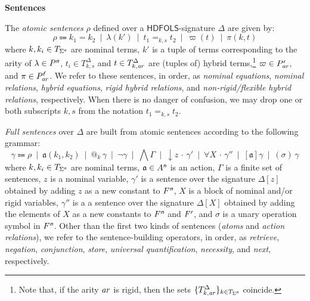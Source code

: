 \documentclass[a4paper,UKenglish,cleveref, autoref]{lipics-v2019}
\makeatletter
\newcommand{\HDFOLS}{{\mathsf{HDFOLS}}}
\newcommand{\alt}{\enspace|\enspace}
\newcommand{\keyscript}[1]{\text{\normalfont\sffamily\itshape #1}}
\newcommand{\ari}{\mathit{a\mkern -1mu r}}
\newcommand{\act}{\mathfrak{a}}
\newcommand{\nominal}{\keyscript{n}}
\newcommand{\rigid}{\keyscript{r}}
\newcommand{\flexible}{\keyscript{f}}
\newcommand{\bigand}{\bigwedge}
\newcommand{\at}[1]{@_{#1}\,}
\newcommand{\nec}[1]{[#1]}
\newcommand{\store}[1]{{\downarrow}#1\,{\cdot}\,}
\newcommand{\forAll}[1]{\forall #1\,{\cdot}\,}
\newcommand{\lnext}[1]{(#1)\,}
\newcommand{\minisec}[1]{%
  \par\addvspace{\smallskipamount}\noindent%
  \textbf{\sffamily #1}\enspace%
}
\makeatother
\begin{document}


\minisec{Sentences}
The \emph{atomic sentences} \(\rho\) defined over a \(\HDFOLS\)-signature \(\Delta\) are given by:
\[
  \rho \Coloneqq
  k_{1} = k_{2} \alt
  \lambda(k') \alt
  t_{1} =_{k,s} t_{2} \alt
  \varpi(t) \alt
  \pi(k, t)
\]
where \(k, k_{i} \in T_{\Sigma^{\nominal}}\) are nominal terms,
\(k'\) is a tuple of terms corresponding to the arity of \(\lambda \in P^{\nominal}\),
\(t_{i} \in T^{\Delta}_{k,s}\) and \(t \in T^{\Delta}_{k,\ari}\) are (tuples of) hybrid terms,\footnote{Note that, if the arity \(\ari\) is rigid, then the sets \(\{T^{\Delta}_{k,\ari}\}_{k \in T_{\Sigma^{\nominal}}}\) coincide.}
\(\varpi \in P^{\rigid}_{\ari}\),
and \(\pi \in P^{\flexible}_{\ari}\).
We refer to these sentences, in order, as \emph{nominal equations}, \emph{nominal relations}, \emph{hybrid equations}, \emph{rigid hybrid relations}, and \emph{non-rigid/flexible hybrid relations}, respectively.
When there is no danger of confusion, we may drop one or both subscripts \(k, s\) from the notation \(t_{1} =_{k,s} t_{2}\).

\emph{Full sentences}\label{sentence-building-operators} over \(\Delta\) are built from atomic sentences according to the following grammar:
\[
  \gamma \Coloneqq
  \rho \alt
  \act(k_{1}, k_{2}) \alt
  \at{k} \gamma \alt
  \lnot \gamma \alt
  \textstyle\bigand \Gamma \alt
  \store{z} \gamma' \alt
  \forAll{X} \gamma'' \alt
  \nec{\act} \gamma \alt
  \lnext{\sigma} \gamma
\]
where \(k, k_{i} \in T_{\Sigma^{\nominal}}\) are nominal terms,
\(\act \in A^{\nominal}\) is an action,
\(\Gamma\) is a finite set of sentences,
\(z\) is a nominal variable,
\(\gamma'\) is a sentence over the signature \(\Delta[z]\) obtained by adding \(z\) as a new constant to \(F^{\nominal}\),
\(X\) is a block of nominal and/or rigid variables,
\(\gamma''\) is a a sentence over the signature \(\Delta[X]\) obtained by adding the elements of \(X\) as a new constants to \(F^{\nominal}\) and \(F^{\rigid}\), and
\(\sigma\) is a unary operation symbol in \(F^{\nominal}\).
Other than the first two kinds of sentences (\emph{atoms} and \emph{action relations}), we refer to the sentence-building operators, in order, as \emph{retrieve}, \emph{negation}, \emph{conjunction}, \emph{store}, \emph{universal quantification}, \emph{necessity}, and \emph{next}, respectively.
\end{document}
